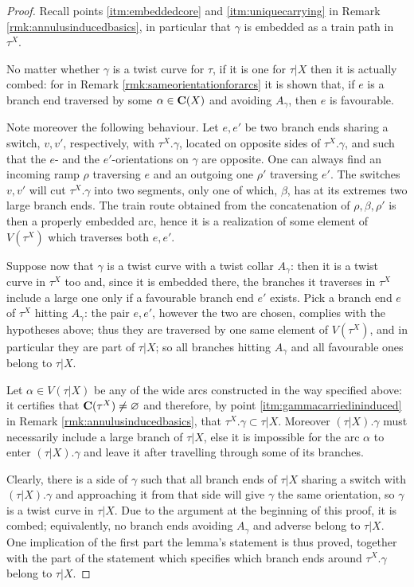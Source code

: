 \begin{proof}
Recall points \ref{itm:embeddedcore} and \ref{itm:uniquecarrying} in Remark \ref{rmk:annulusinducedbasics}, in particular that $\gamma$ is embedded as a train path in $\tau^X$.

No matter whether $\gamma$ is a twist curve for $\tau$, if it is one for $\tau|X$ then it is actually combed: for in Remark \ref{rmk:sameorientationforarcs} it is shown that, if $e$ is a branch end traversed by some $\alpha\in\mathbf C(X)$ and avoiding $A_\gamma$, then $e$ is favourable.

Note moreover the following behaviour. Let $e,e'$ be two branch ends sharing a switch, $v,v'$, respectively, with $\tau^X.\gamma$, located on opposite sides of $\tau^X.\gamma$, and such that the $e$- and the $e'$-orientations on $\gamma$ are opposite. One can always find an incoming ramp $\rho$ traversing $e$ and an outgoing one $\rho'$ traversing $e'$. The switches $v,v'$ will cut $\tau^X.\gamma$ into two segments, only one of which, $\beta$, has at its extremes two large branch ends. The train route obtained from the concatenation of $\rho,\beta,\rho'$ is then a properly embedded arc, hence it is a realization of some element of $V(\tau^X)$ which traverses both $e, e'$.

Suppose now that $\gamma$ is a twist curve with a twist collar $A_\gamma$: then it is a twist curve in $\tau^X$ too and, since it is embedded there, the branches it traverses in $\tau^X$ include a large one only if a favourable branch end $e'$ exists. Pick a branch end $e$ of $\tau^X$ hitting $A_\gamma$: the pair $e,e'$, however the two are chosen, complies with the hypotheses above; thus they are traversed by one same element of $V(\tau^X)$, and in particular they are part of $\tau|X$; so all branches hitting $A_\gamma$ and all favourable ones belong to $\tau|X$.

Let $\alpha\in V(\tau|X)$ be any of the wide arcs constructed in the way specified above: it certifies that $\mathbf C(\tau^X)\not=\varnothing$ and therefore, by point \ref{itm:gammacarriedininduced} in Remark \ref{rmk:annulusinducedbasics}, that $\tau^X.\gamma\subset \tau|X$. Moreover $(\tau|X).\gamma$ must necessarily include a large branch of $\tau|X$, else it is impossible for the arc $\alpha$ to enter $(\tau|X).\gamma$ and leave it after travelling through some of its branches.

Clearly, there is a side of $\gamma$ such that all branch ends of $\tau|X$ sharing a switch with $(\tau|X).\gamma$ and approaching it from that side will give $\gamma$ the same orientation, so $\gamma$ is a twist curve in $\tau|X$. Due to the argument at the beginning of this proof, it is combed; equivalently, no branch ends avoiding $A_\gamma$ and adverse belong to $\tau|X$. One implication of the first part the lemma's statement is thus proved, together with the part of the statement which specifies which branch ends around $\tau^X.\gamma$ belong to $\tau|X$.


\end{proof}
